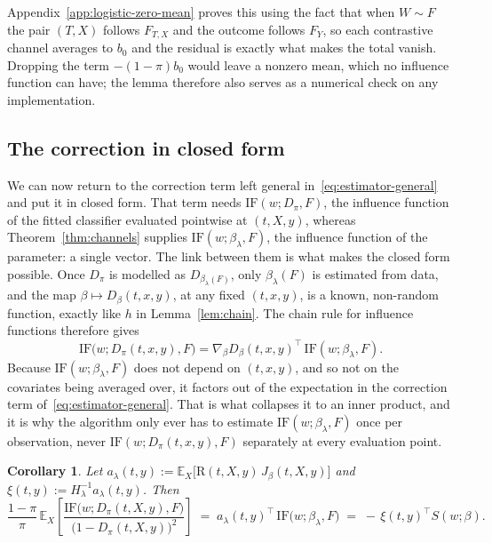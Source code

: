 \documentclass[11pt]{article}
\theoremstyle{plain}
\newtheorem{corollary}{Corollary}
\theoremstyle{definition}
\theoremstyle{remark}
\newcommand{\pE}{\ensuremath{\mathbb{E}}}
\newcommand{\ratio}{\ensuremath{\pi}}
\newcommand{\contrast}{D_{\ratio}}
\newcommand{\DensityRatio}{\text{R}}
\newcommand{\IF}{\mathrm{IF}}
\newcommand{\score}{S}
\begin{document}
Appendix~\ref{app:logistic-zero-mean} proves this using the fact that when $W \sim F$ the pair
$(T,X)$ follows $F_{T,X}$ and the outcome follows $F_Y$, so each contrastive channel averages
to $b_0$ and the residual is exactly what makes the total vanish. Dropping the term
$-(1-\ratio)b_0$ would leave a nonzero mean, which no influence function can have; the lemma
therefore also serves as a numerical check on any implementation.

\subsection{The correction in closed form}
\label{sec:mcd-general-collapse}

We can now return to the correction term left general in~\eqref{eq:estimator-general} and put
it in closed form. That term needs $\IF(w;\contrast,F)$, the influence function of the fitted
classifier evaluated pointwise at $(t,X,y)$, whereas Theorem~\ref{thm:channels} supplies
$\IF(w;\beta_\lambda,F)$, the influence function of the parameter: a single vector. The link
between them is what makes the closed form possible. Once $\contrast$ is modelled as
$D_{\beta_\lambda(F)}$, only $\beta_\lambda(F)$ is estimated from data, and the map
$\beta\mapsto D_\beta(t,x,y)$, at any fixed $(t,x,y)$, is a known, non-random function, exactly
like $h$ in Lemma~\ref{lem:chain}. The chain rule for influence functions therefore gives
\begin{equation}
\IF\big(w;\contrast(t,x,y),F\big) = \nabla_\beta D_\beta(t,x,y)^\top\,\IF(w;\beta_\lambda,F) .
\label{eq:if-chain}
\end{equation}
Because $\IF(w;\beta_\lambda,F)$ does not depend on $(t,x,y)$, and so not on the covariates
being averaged over, it factors out of the expectation in the correction term
of~\eqref{eq:estimator-general}. That is what collapses it to an inner product, and it is why
the algorithm only ever has to estimate $\IF(w;\beta_\lambda,F)$ once per observation, never
$\IF(w;\contrast(t,x,y),F)$ separately at every evaluation point.

\begin{corollary}
\label{cor:collapse}
Let $a_\lambda(t,y) := \pE_X\big[ \DensityRatio(t,X,y)\,J_\beta(t,X,y) \big]$ and
$\xi(t,y) := H_\lambda^{-1}a_\lambda(t,y)$. Then
\begin{equation}
\frac{1-\ratio}{\ratio}\,
\pE_X\!\left[ \frac{\IF\big(w;\contrast(t,X,y),F\big)}{\big(1-\contrast(t,X,y)\big)^{2}} \right]
\;=\; a_\lambda(t,y)^\top\, \IF\big(w;\beta_\lambda,F\big)
\;=\; -\,\xi(t,y)^\top \score(w;\beta) .
\label{eq:collapse}
\end{equation}
\end{corollary}
\end{document}
